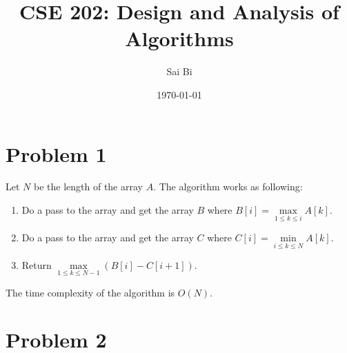 \documentclass[a4paper,11pt]{article}
\theoremstyle{mytheor}
\begin{document}
\title{CSE 202: Design and Analysis of Algorithms}

\author{Sai Bi}

\date{\today}

\maketitle

\section*{Problem 1}
Let $N$ be the length of the array $A$. The algorithm works as following:
\begin{enumerate}
\item
Do a pass to the array and get the array $B$ where $B[i]=\max\limits_{1\leq k \leq i} A[k]$.
\item 
Do a pass to the array and get the array $C$ where $C[i]=\min\limits_{i\leq k \leq N} A[k]$.
\item
Return $\max\limits_{1\leq k \leq N-1} (B[i] - C[i+1])$.
\end{enumerate}
The time complexity of the algorithm is $O(N)$.

\section*{Problem 2}
\end{document}
